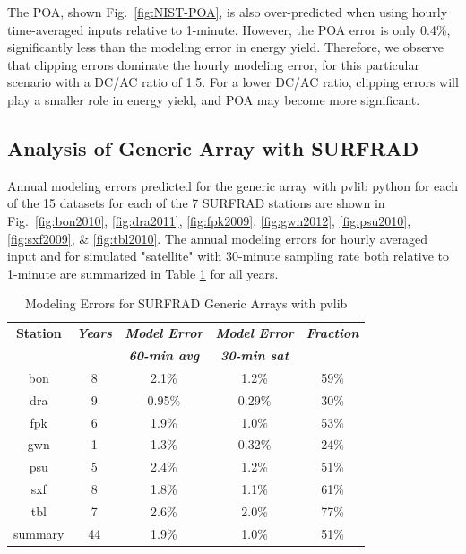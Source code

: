 \documentclass[conference]{IEEEtran}
\begin{document}
The POA, shown Fig.~\ref{fig:NIST-POA}, is also over-predicted when using hourly time-averaged inputs relative to 1-minute. However, the POA error is only 0.4\%, significantly less than the modeling error in energy yield. Therefore, we observe that clipping errors dominate the hourly modeling error, for this particular scenario with a DC/AC ratio of 1.5. For a lower DC/AC ratio, clipping errors will play a smaller role in energy yield, and POA may become more significant.

\subsection{Analysis of Generic Array with SURFRAD}
Annual modeling errors predicted for the generic array with pvlib python for each of the 15 datasets for each of the 7 SURFRAD stations are shown in Fig.~\ref{fig:bon2010}, \ref{fig:dra2011}, \ref{fig:fpk2009}, \ref{fig:gwn2012}, \ref{fig:psu2010}, \ref{fig:sxf2009}, \& \ref{fig:tbl2010}. The annual modeling errors for hourly averaged input and for simulated "satellite" with 30-minute sampling rate both relative to 1-minute are summarized in Table \ref{table:SURFRAD-summary} for all years.

\begin{table}[htbp]
\caption{Modeling Errors for SURFRAD Generic Arrays with pvlib}
\begin{center}
\begin{tabular}{|c|c|c|c|c|}
\hline
\textbf{Station}& \textbf{\textit{Years}}& \textbf{\textit{Model Error}}& \textbf{\textit{Model Error}}& \textbf{\textit{Fraction}} \\
                &                        & \textbf{\textit{60-min avg}} & \textbf{\textit{30-min sat}} &                                \\
\hline
bon  & 8 & 2.1\% & 1.2\% & 59\% \\
dra  & 9 & 0.95\%& 0.29\%& 30\% \\
fpk  & 6 & 1.9\% & 1.0\% & 53\% \\
gwn  & 1 & 1.3\% & 0.32\%& 24\% \\
psu  & 5 & 2.4\% & 1.2\% & 51\% \\
sxf  & 8 & 1.8\% & 1.1\% & 61\% \\
tbl  & 7 & 2.6\% & 2.0\% & 77\% \\
\hline
summary& 44& 1.9\% & 1.0\% & 51\% \\
\hline
\end{tabular}
\label{table:SURFRAD-summary}
\end{center}
\end{table}
\end{document}

